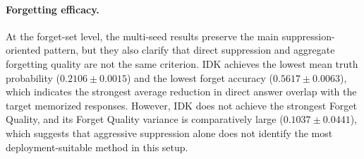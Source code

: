\documentclass[conference]{IEEEtran}
\begin{document}
\begin{table}[htbp]
\caption{TOFU Forget-Split Results Across Unlearning Strategies (mean $\pm$ std over 3 seeds)}
\label{tab:main_results}
\centering
{}
\end{table}

\begin{table}[htbp]
\caption{Cross-Split Utility and Privacy Trade-offs (mean $\pm$ std over 3 seeds)}
\label{tab:cross_split_results}
\centering
{}
\end{table}

\paragraph{Forgetting efficacy.}
At the forget-set level, the multi-seed results preserve the main suppression-oriented pattern, but they also clarify that direct suppression and aggregate forgetting quality are not the same criterion. IDK achieves the lowest mean truth probability ($0.2106 \pm 0.0015$) and the lowest forget accuracy ($0.5617 \pm 0.0063$), which indicates the strongest average reduction in direct answer overlap with the target memorized responses. However, IDK does not achieve the strongest Forget Quality, and its Forget Quality variance is comparatively large ($0.1037 \pm 0.0441$), which suggests that aggressive suppression alone does not identify the most deployment-suitable method in this setup.
\end{document}
